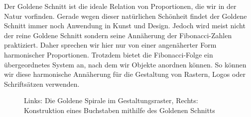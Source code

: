 \documentclass[12pt,a4paper]{article}
\begin{document}

Der Goldene Schnitt ist die ideale Relation von Proportionen, die wir in der Natur vorfinden. Gerade wegen dieser natürlichen Schönheit findet der Goldene Schnitt immer noch Anwendung in Kunst und Design. Jedoch wird meist nicht der reine Goldene Schnitt sondern seine Annäherung der Fibonacci-Zahlen praktiziert. Daher sprechen wir hier nur von einer angenäherter Form harmonischer Proportionen. Trotzdem bietet die Fibonacci-Folge ein übergeordnetes System an, nach dem wir Objekte anordnen können. So können wir diese harmonische Annäherung für die Gestaltung von Rastern, Logos oder Schriftsätzen verwenden.

\begin{figure}[htbp]
 \hfill
{}
\caption{Links: Die Goldene Spirale im Gestaltungsraster, Rechts: Konstruktion eines Buchstaben mithilfe des Goldenen Schnitts \protect\footnotemark[9]}
\end{figure}

\end{document}
